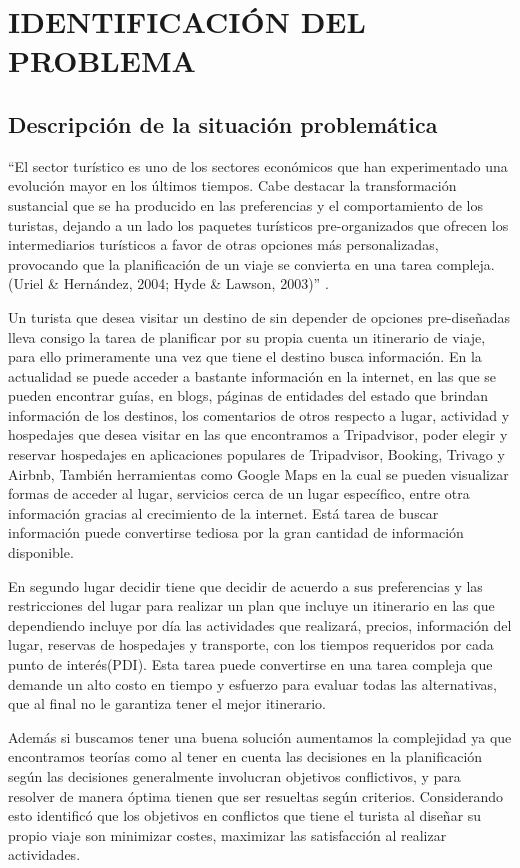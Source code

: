 \chapter{IDENTIFICACIÓN DEL PROBLEMA }
\section{Descripción de la situación problemática}
“El sector turístico es uno de los sectores económicos que han experimentado una evolución mayor en los últimos tiempos. Cabe destacar la transformación sustancial que se ha producido en las preferencias y el comportamiento de los turistas, dejando a un lado los paquetes turísticos pre-organizados que ofrecen los intermediarios turísticos a favor de otras opciones más personalizadas, provocando que la planificación de un viaje se convierta en una tarea compleja.(Uriel \& Hernández, 2004; Hyde \& Lawson, 2003)” \cite{RodriguezDiaz2012SistemaPersonalizado}. 

Un turista que desea visitar un destino de sin depender de opciones pre-diseñadas lleva consigo la tarea de planificar por su propia cuenta un itinerario de viaje, para ello primeramente una vez que tiene el destino busca información. En la actualidad se puede acceder a bastante información en la internet, en las que se pueden encontrar guías, en blogs, páginas de entidades del estado que brindan información de los destinos, los comentarios de otros respecto a lugar, actividad y hospedajes que desea visitar en las que encontramos a Tripadvisor, poder elegir y reservar hospedajes en aplicaciones populares de Tripadvisor, Booking, Trivago y Airbnb, También herramientas como Google Maps en la cual se pueden visualizar formas de acceder al lugar, servicios cerca de un lugar específico, entre otra información gracias al crecimiento de la internet. Está tarea de buscar información puede convertirse tediosa por la gran cantidad de información disponible.

En segundo lugar decidir tiene que decidir de acuerdo a sus preferencias y las restricciones del lugar para realizar un plan que incluye un itinerario en las que dependiendo incluye por día las actividades que realizará, precios, información del lugar, reservas de hospedajes y transporte, con los tiempos requeridos por cada punto de interés(PDI). Esta tarea puede convertirse en una tarea compleja que demande un alto costo en tiempo y esfuerzo para evaluar todas las alternativas, que al final no le garantiza tener el mejor itinerario.

Además si buscamos tener una buena solución aumentamos la complejidad ya que encontramos teorías como al tener en cuenta las decisiones en la planificación según \cite{Ehrgott2005MulticriteriaOptimization} las decisiones generalmente involucran objetivos conflictivos, y para resolver de manera óptima tienen que ser resueltas según criterios. Considerando esto \cite{RodriguezDiaz2012SistemaPersonalizado} identificó que los objetivos en conflictos que tiene el turista al diseñar su propio viaje son minimizar costes, maximizar las satisfacción al realizar actividades. 

